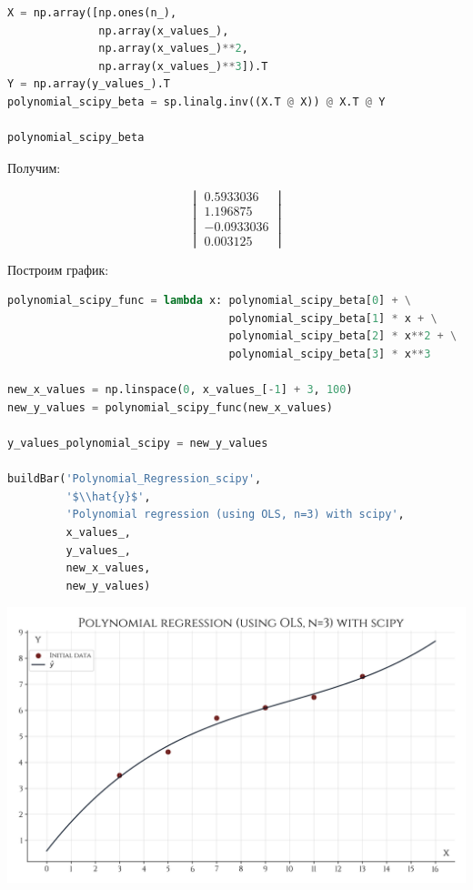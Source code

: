 \documentclass[a4paper, 14pt]{extarticle}
\begin{document}
\begin{center}
    \begin{lstlisting}[language=Python]
X = np.array([np.ones(n_), 
              np.array(x_values_), 
              np.array(x_values_)**2, 
              np.array(x_values_)**3]).T
Y = np.array(y_values_).T
polynomial_scipy_beta = sp.linalg.inv((X.T @ X)) @ X.T @ Y

polynomial_scipy_beta
    \end{lstlisting}
\end{center}

Получим:

\begin{equation*}
    \begin{vmatrix}
        0.5933036 \\
        1.196875 \\
        -0.0933036 \\
        0.003125
    \end{vmatrix}
\end{equation*}

Построим график:

\begin{center}
    \begin{lstlisting}[language=Python]
polynomial_scipy_func = lambda x: polynomial_scipy_beta[0] + \
                                  polynomial_scipy_beta[1] * x + \
                                  polynomial_scipy_beta[2] * x**2 + \
                                  polynomial_scipy_beta[3] * x**3

new_x_values = np.linspace(0, x_values_[-1] + 3, 100)
new_y_values = polynomial_scipy_func(new_x_values)

y_values_polynomial_scipy = new_y_values

buildBar('Polynomial_Regression_scipy', 
         '$\\hat{y}$', 
         'Polynomial regression (using OLS, n=3) with scipy', 
         x_values_, 
         y_values_, 
         new_x_values, 
         new_y_values)
    \end{lstlisting}
\end{center}

\begin{center}
    \includegraphics[width=1\textwidth, height=1\textheight, keepaspectratio]{Polynomial_Regression_scipy} \\
\end{center}
\end{document}
